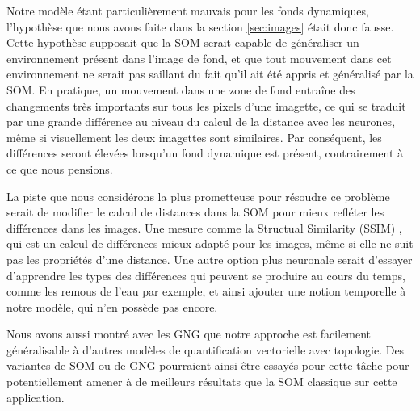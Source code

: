 	Notre modèle étant particulièrement mauvais pour les fonds dynamiques, l'hypothèse que nous avons faite dans la section \ref{sec:images} était donc fausse. Cette hypothèse supposait que la SOM serait capable de généraliser un environnement présent dans l'image de fond, et que tout mouvement dans cet environnement ne serait pas saillant du fait qu'il ait été appris et généralisé par la SOM. En pratique, un mouvement dans une zone de fond entraîne des changements très importants sur tous les pixels d'une imagette, ce qui se traduit par une grande différence au niveau du calcul de la distance avec les neurones, même si visuellement les deux imagettes sont similaires. Par conséquent, les différences seront élevées lorsqu'un fond dynamique est présent, contrairement à ce que nous pensions.

	La piste que nous considérons la plus prometteuse pour résoudre ce problème serait de modifier le calcul de distances dans la SOM pour mieux refléter les différences dans les images. Une mesure comme la Structual Similarity (SSIM) \cite{wang2004image}, qui est un calcul de différences mieux adapté pour les images, même si elle ne suit pas les propriétés d'une distance. Une autre option plus neuronale serait d'essayer d'apprendre les types des différences qui peuvent se produire au cours du temps, comme les remous de l'eau par exemple, et ainsi ajouter une notion temporelle à notre modèle, qui n'en possède pas encore.

	Nous avons aussi montré avec les GNG que notre approche est facilement généralisable à d'autres modèles de quantification vectorielle avec topologie. Des variantes de SOM ou de GNG pourraient ainsi être essayés pour cette tâche pour potentiellement amener à de meilleurs résultats que la SOM classique sur cette application.




